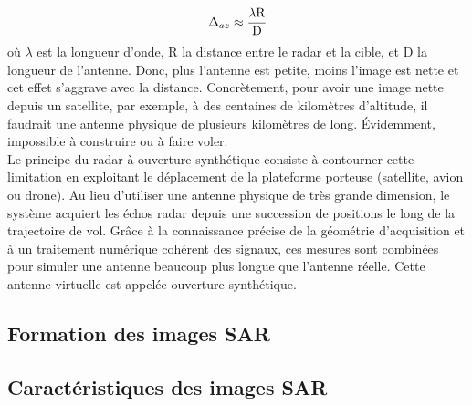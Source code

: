 \begin{equation}
    \Delta_{az} \approx \cfrac{\lambda \mathrm{R}}{\mathrm{D}}
\end{equation}
où \(\lambda\) est la longueur d'onde, \(\mathrm{R}\) la distance entre le radar et la cible, et \(\mathrm{D}\) la longueur de l'antenne.
Donc, plus l'antenne est petite, moins l'image est nette et cet effet s'aggrave avec la distance.
Concrètement, pour avoir une image nette depuis un satellite, par exemple, à des centaines de kilomètres d'altitude, il faudrait une antenne physique de plusieurs kilomètres de long. Évidemment, impossible à construire ou à faire voler.\\
Le principe du radar à ouverture synthétique consiste à contourner cette limitation en exploitant le déplacement de la plateforme porteuse (satellite, avion ou drone). Au lieu d'utiliser une antenne physique de très grande dimension, le système acquiert les échos radar depuis une succession de positions le long de la trajectoire de vol. Grâce à la connaissance précise de la géométrie d'acquisition et à un traitement numérique cohérent des signaux, ces mesures sont combinées pour simuler une antenne beaucoup plus longue que l'antenne réelle. Cette antenne virtuelle est appelée ouverture synthétique.
\subsection{Formation des images SAR}
\subsection{Caractéristiques des images SAR}